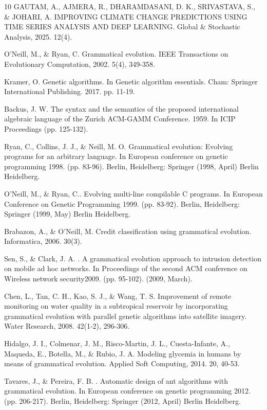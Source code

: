 \documentclass[12pt]{Definitions/academia}
\begin{document}
\begin{thebibliography}{10}
GAUTAM, A., AJMERA, R., DHARAMDASANI, D. K.,
SRIVASTAVA, S., \& JOHARI, A. IMPROVING CLIMATE CHANGE PREDICTIONS
USING TIME SERIES ANALYSIS AND DEEP LEARNING. Global \& Stochastic
Analysis, 2025. 12(4).

O'Neill, M., \& Ryan, C. Grammatical evolution.
IEEE Transactions on Evolutionary Computation, 2002. 5(4), 349-358.

Kramer, O. Genetic algorithms. In Genetic algorithm
essentials. Cham: Springer International Publishing. 2017. pp. 11-19.

Backus, J. W. The syntax and the semantics of
the proposed international algebraic language of the Zurich ACM-GAMM
Conference. 1959. In ICIP Proceedings (pp. 125-132).

Ryan, C., Collins, J. J., \& Neill, M. O. Grammatical
evolution: Evolving programs for an arbitrary language. In European
conference on genetic programming 1998. (pp. 83-96). Berlin, Heidelberg:
Springer (1998, April) Berlin Heidelberg.

O\textquoteright Neill, M., \& Ryan, C.. Evolving
multi-line compilable C programs. In European Conference on Genetic
Programming 1999. (pp. 83-92). Berlin, Heidelberg: Springer (1999,
May) Berlin Heidelberg.

Brabazon, A., \& O'Neill, M. Credit classification
using grammatical evolution. Informatica, 2006. 30(3).

Sen, S., \& Clark, J. A. . A grammatical evolution
approach to intrusion detection on mobile ad hoc networks. In Proceedings
of the second ACM conference on Wireless network security2009. (pp.
95-102). (2009, March).

Chen, L., Tan, C. H., Kao, S. J., \& Wang, T.
S. Improvement of remote monitoring on water quality in a subtropical
reservoir by incorporating grammatical evolution with parallel genetic
algorithms into satellite imagery. Water Research, 2008. 42(1-2),
296-306.

Hidalgo, J. I., Colmenar, J. M., Risco-Martin,
J. L., Cuesta-Infante, A., Maqueda, E., Botella, M., \& Rubio, J.
A. Modeling glycemia in humans by means of grammatical evolution.
Applied Soft Computing, 2014. 20, 40-53.

Tavares, J., \& Pereira, F. B. . Automatic
design of ant algorithms with grammatical evolution. In European conference
on genetic programming 2012. (pp. 206-217). Berlin, Heidelberg: Springer
(2012, April) Berlin Heidelberg.


\end{thebibliography}
\end{document}
